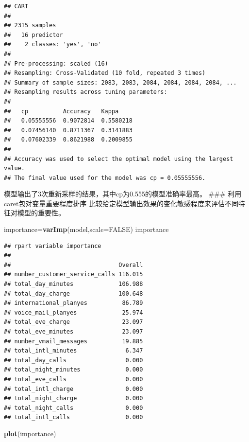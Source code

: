 \documentclass[
]{article}
\newenvironment{Shaded}{\begin{snugshade}}{\end{snugshade}}
\newcommand{\DataTypeTok}[1]{\textcolor[rgb]{0.13,0.29,0.53}{#1}}
\newcommand{\KeywordTok}[1]{\textcolor[rgb]{0.13,0.29,0.53}{\textbf{#1}}}
\newcommand{\NormalTok}[1]{#1}
\newcommand{\OtherTok}[1]{\textcolor[rgb]{0.56,0.35,0.01}{#1}}
\begin{document}
\begin{verbatim}
## CART 
## 
## 2315 samples
##   16 predictor
##    2 classes: 'yes', 'no' 
## 
## Pre-processing: scaled (16) 
## Resampling: Cross-Validated (10 fold, repeated 3 times) 
## Summary of sample sizes: 2083, 2083, 2084, 2084, 2084, 2084, ... 
## Resampling results across tuning parameters:
## 
##   cp          Accuracy   Kappa    
##   0.05555556  0.9072814  0.5580218
##   0.07456140  0.8711367  0.3141883
##   0.07602339  0.8621988  0.2009855
## 
## Accuracy was used to select the optimal model using the largest value.
## The final value used for the model was cp = 0.05555556.
\end{verbatim}

模型输出了3次重新采样的结果，其中cp为0.555的模型准确率最高。 \#\#\#
利用caret包对变量重要程度排序
比较给定模型输出效果的变化敏感程度来评估不同特征对模型的重要性。

\begin{Shaded}
\begin{Highlighting}[]
\NormalTok{importance=}\KeywordTok{varImp}\NormalTok{(model,}\DataTypeTok{scale=}\OtherTok{FALSE}\NormalTok{)}
\NormalTok{importance}
\end{Highlighting}
\end{Shaded}

\begin{verbatim}
## rpart variable importance
## 
##                               Overall
## number_customer_service_calls 116.015
## total_day_minutes             106.988
## total_day_charge              100.648
## international_planyes          86.789
## voice_mail_planyes             25.974
## total_eve_charge               23.097
## total_eve_minutes              23.097
## number_vmail_messages          19.885
## total_intl_minutes              6.347
## total_day_calls                 0.000
## total_night_minutes             0.000
## total_eve_calls                 0.000
## total_intl_charge               0.000
## total_night_charge              0.000
## total_night_calls               0.000
## total_intl_calls                0.000
\end{verbatim}

\begin{Shaded}
\begin{Highlighting}[]
\KeywordTok{plot}\NormalTok{(importance)}
\end{Highlighting}
\end{Shaded}
\end{document}

